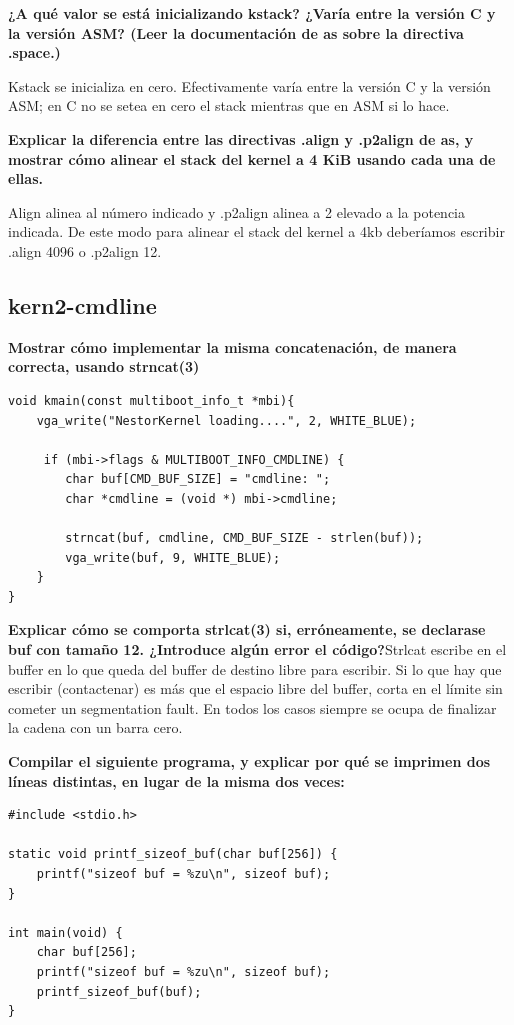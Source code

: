 \documentclass[a4paper]{article}
\begin{document}
\textbf{¿A qué valor se está inicializando kstack? ¿Varía entre la versión C y la versión ASM? (Leer la documentación de as sobre la directiva .space.)}

Kstack se inicializa en cero. Efectivamente varía entre la versión C y la versión ASM; en C no se setea en cero el stack mientras que en ASM si lo hace.

\textbf{Explicar la diferencia entre las directivas .align y .p2align de as, y mostrar cómo alinear el stack del kernel a 4 KiB usando cada una de ellas.}

Align alinea al número indicado y .p2align alinea a 2 elevado a la potencia indicada.
De este modo para alinear el stack del kernel a 4kb deberíamos escribir .align 4096 o .p2align 12.

\subsection{kern2-cmdline}
\textbf{Mostrar cómo implementar la misma concatenación, de manera correcta, usando strncat(3)}
 
\begin{lstlisting}
void kmain(const multiboot_info_t *mbi){
    vga_write("NestorKernel loading....", 2, WHITE_BLUE);
    
     if (mbi->flags & MULTIBOOT_INFO_CMDLINE) {
        char buf[CMD_BUF_SIZE] = "cmdline: ";
        char *cmdline = (void *) mbi->cmdline;
       
        strncat(buf, cmdline, CMD_BUF_SIZE - strlen(buf));
        vga_write(buf, 9, WHITE_BLUE);
    }
}
\end{lstlisting}

\textbf{Explicar cómo se comporta strlcat(3) si, erróneamente, se declarase buf con tamaño 12. ¿Introduce algún error el código?}\newline \newline Strlcat escribe en el buffer en lo que queda del buffer de destino libre para escribir. Si lo que hay que escribir (contactenar) es más que el espacio libre del buffer, corta en el límite sin cometer un segmentation fault. En todos los casos siempre se ocupa de finalizar la cadena con un barra cero.\newline 

\textbf{\newline Compilar el siguiente programa, y explicar por qué se imprimen dos líneas distintas, en lugar de la misma dos veces:}\newline \newline \begin{lstlisting}
#include <stdio.h>

static void printf_sizeof_buf(char buf[256]) {
    printf("sizeof buf = %zu\n", sizeof buf);
}

int main(void) {
    char buf[256];
    printf("sizeof buf = %zu\n", sizeof buf);
    printf_sizeof_buf(buf);
}
\end{lstlisting}
\end{document}
